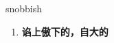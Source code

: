 
\begin{frame}
{\huge snobbish}
\begin{center}
\begin{enumerate}\Large
  \item \textbf{谄上傲下的，自大的}
\end{enumerate}
\end{center}
\end{frame}
